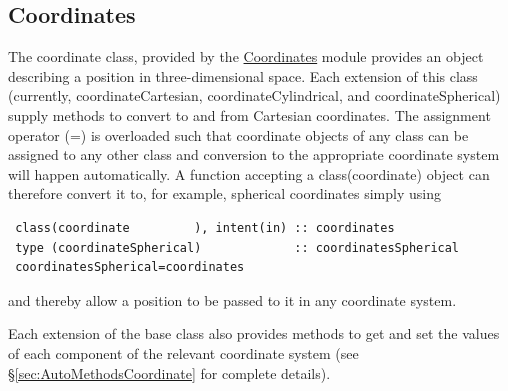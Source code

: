 \subsection{Coordinates}\label{sec:Coordinates}

The {\normalfont \ttfamily coordinate} class, provided by the \hyperlink{objects.coordinates.F90:coordinates}{\normalfont \ttfamily Coordinates} module provides an object describing a position in three-dimensional space. Each extension of this class (currently, {\normalfont \ttfamily coordinateCartesian}, {\normalfont \ttfamily coordinateCylindrical}, and {\normalfont \ttfamily coordinateSpherical}) supply methods to convert to and from Cartesian coordinates. The assignment operator ({\normalfont \ttfamily =}) is overloaded such that coordinate objects of any class can be assigned to any other class and conversion to the appropriate coordinate system will happen automatically. A function accepting a {\normalfont \ttfamily class(coordinate)} object can therefore convert it to, for example, spherical coordinates simply using
\begin{verbatim}
 class(coordinate         ), intent(in) :: coordinates
 type (coordinateSpherical)             :: coordinatesSpherical
 coordinatesSpherical=coordinates
\end{verbatim}
and thereby allow a position to be passed to it in any coordinate system.

Each extension of the base class also provides methods to get and set the values of each component of the relevant coordinate system (see \S\ref{sec:AutoMethodsCoordinate} for complete details).
